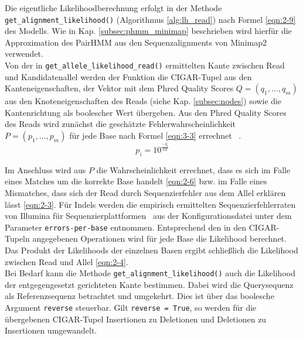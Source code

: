 Die eigentliche Likelihoodberechnung erfolgt in der Methode \linebreak \lstinline|get_alignment_likelihood()| (Algorithmus \ref{alg:lh_read}) nach Formel \eqref{eqn:2-9} des Modells. Wie in Kap. \ref{subsec:phmm_minimap} beschrieben wird hierfür die Approximation des PairHMM aus den Sequenzalignments von Minimap2 verwendet.\\

Von der in \lstinline|get_allele_likelihood_read()| ermittelten Kante zwischen Read und Kandidatenallel werden der Funktion die CIGAR-Tupel aus den Kanteneigenschaften, der Vektor mit dem  Phred Quality Scores $Q =(q_{1}, \dots, q_{m})$ aus den Knoteneigenschaften des Reads (siehe Kap. \ref {subsec:nodes}) sowie die Kantenrichtung als boolescher Wert übergeben. Aus den Phred Quality Scores des Reads wird zunächst die geschätzte Fehlerwahrscheinlichkeit $ P=(p_{1}, \dots, p_{m}) $ für jede Base nach Formel \eqref{eqn:3-3} errechnet ~\cite{ewing_1998}.  
\begin{equation} \label{eqn:3-3}
\tag{3-3}
p_{i} = 10^{\frac{-q_{i}}{10}}
\end{equation}

Im Anschluss wird aus $P$ die Wahrscheinlichkeit errechnet, dass es sich im Falle eines Matches um die korrekte Base handelt \eqref{eqn:2-6} bzw. im Falle eines Mismatches, dass sich der Read durch Sequenzierfehler aus dem Allel erklären lässt \eqref{eqn:2-3}. Für Indels werden die empirisch ermittelten Sequenzierfehlerraten von Illumina für Sequenzierplattformen~\cite{schirmer_2016} aus der Konfigurationsdatei unter dem Parameter \lstinline|errors-per-base| entnommen. Entsprechend den in den CIGAR-Tupeln angegebenen Operationen wird für jede Base die Likelihood berechnet. Das Produkt der Likelihoods der einzelnen Basen ergibt schließlich die Likelihood zwischen Read und Allel \eqref{eqn:2-4}.\\

Bei Bedarf kann die Methode \lstinline|get_alignment_likelihood()| auch  die Likelihood der entgegengesetzt gerichteten Kante bestimmen. Dabei wird die Querysequenz als Referenzsequenz betrachtet und umgekehrt. Dies ist über das boolesche Argument \lstinline|reverse| steuerbar. Gilt \lstinline|reverse = True|, so werden für die übergebenen CIGAR-Tupel Insertionen zu Deletionen und Deletionen zu Insertionen umgewandelt.\\

